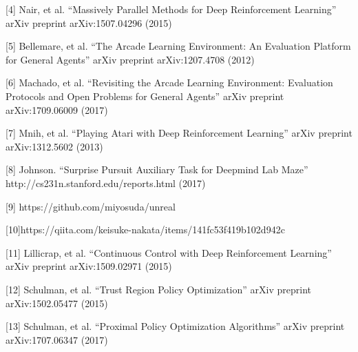 \documentclass[12pt,twocolumn,letterpaper]{article}
\begin{document}
[4] Nair, et al. “Massively Parallel Methods for Deep Reinforcement Learning” arXiv preprint arXiv:1507.04296 (2015)

[5] Bellemare, et al. “The Arcade Learning Environment: An Evaluation Platform for General Agents” arXiv preprint arXiv:1207.4708 (2012)

[6] Machado, et al. “Revisiting the Arcade Learning Environment: Evaluation Protocols and Open Problems for General Agents” arXiv preprint arXiv:1709.06009 (2017)

[7] Mnih, et al. “Playing Atari with Deep Reinforcement Learning” arXiv preprint arXiv:1312.5602 (2013)

[8] Johnson. “Surprise Pursuit Auxiliary Task for Deepmind Lab Maze” http://cs231n.stanford.edu/reports.html (2017)

[9] https://github.com/miyosuda/unreal 

[10]https://qiita.com/keisuke-nakata/items/141fc53f419b102d942c 

[11] Lillicrap, et al. “Continuous Control with Deep Reinforcement Learning” arXiv preprint arXiv:1509.02971 (2015)

[12] Schulman, et al. “Trust Region Policy Optimization” arXiv preprint arXiv:1502.05477 (2015)

[13] Schulman, et al. “Proximal Policy Optimization Algorithms” arXiv preprint arXiv:1707.06347 (2017)

{\small


}
\end{document}
